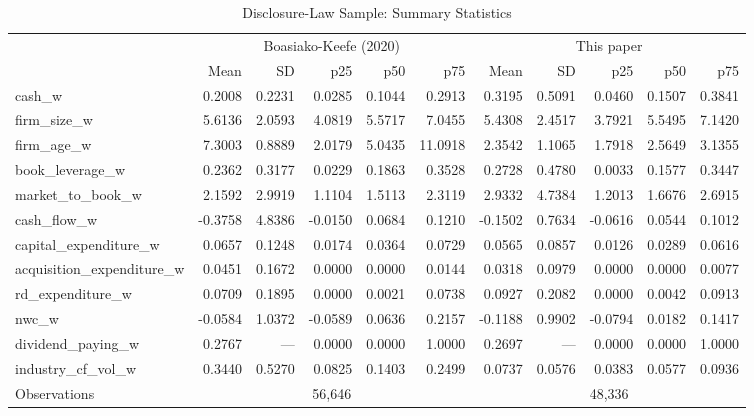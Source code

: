 \begin{table}[H]
\centering
\caption{Disclosure-Law Sample: Summary Statistics}
\label{tab:boasiako_summary_stats}
\small\setlength{\tabcolsep}{4pt}
\begin{tabular}{lrrrrr rrrrr}
\toprule
 & \multicolumn{5}{c}{Boasiako-Keefe (2020)} & \multicolumn{5}{c}{This paper} \\
\cmidrule(lr){2-6} \cmidrule(lr){7-11}
 & Mean & SD & p25 & p50 & p75 & Mean & SD & p25 & p50 & p75 \\
\midrule
  cash\_w & 0.2008 & 0.2231 & 0.0285 & 0.1044 & 0.2913 & 0.3195 & 0.5091 & 0.0460 & 0.1507 & 0.3841 \\
  firm\_size\_w & 5.6136 & 2.0593 & 4.0819 & 5.5717 & 7.0455 & 5.4308 & 2.4517 & 3.7921 & 5.5495 & 7.1420 \\
  firm\_age\_w & 7.3003 & 0.8889 & 2.0179 & 5.0435 & 11.0918 & 2.3542 & 1.1065 & 1.7918 & 2.5649 & 3.1355 \\
  book\_leverage\_w & 0.2362 & 0.3177 & 0.0229 & 0.1863 & 0.3528 & 0.2728 & 0.4780 & 0.0033 & 0.1577 & 0.3447 \\
  market\_to\_book\_w & 2.1592 & 2.9919 & 1.1104 & 1.5113 & 2.3119 & 2.9332 & 4.7384 & 1.2013 & 1.6676 & 2.6915 \\
  cash\_flow\_w & -0.3758 & 4.8386 & -0.0150 & 0.0684 & 0.1210 & -0.1502 & 0.7634 & -0.0616 & 0.0544 & 0.1012 \\
  capital\_expenditure\_w & 0.0657 & 0.1248 & 0.0174 & 0.0364 & 0.0729 & 0.0565 & 0.0857 & 0.0126 & 0.0289 & 0.0616 \\
  acquisition\_expenditure\_w & 0.0451 & 0.1672 & 0.0000 & 0.0000 & 0.0144 & 0.0318 & 0.0979 & 0.0000 & 0.0000 & 0.0077 \\
  rd\_expenditure\_w & 0.0709 & 0.1895 & 0.0000 & 0.0021 & 0.0738 & 0.0927 & 0.2082 & 0.0000 & 0.0042 & 0.0913 \\
  nwc\_w & -0.0584 & 1.0372 & -0.0589 & 0.0636 & 0.2157 & -0.1188 & 0.9902 & -0.0794 & 0.0182 & 0.1417 \\
  dividend\_paying\_w & 0.2767 & --- & 0.0000 & 0.0000 & 1.0000 & 0.2697 & --- & 0.0000 & 0.0000 & 1.0000 \\
  industry\_cf\_vol\_w & 0.3440 & 0.5270 & 0.0825 & 0.1403 & 0.2499 & 0.0737 & 0.0576 & 0.0383 & 0.0577 & 0.0936 \\
\midrule
  Observations & \multicolumn{5}{c}{56,646} & \multicolumn{5}{c}{48,336} \\
\bottomrule
\end{tabular}
\end{table}
